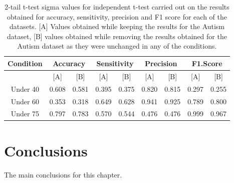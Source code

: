 \begin{table}[!htbp]
\centering
\begin{tabular}{*9c}
  \hline
  \rowcolor{LightCyan}
Condition &\multicolumn{2}{c}{Accuracy} &\multicolumn{2}{c}{Sensitivity} &\multicolumn{2}{c}{Precision}&\multicolumn{2}{c}{F1.Score}\\
  \hline
           & [A] & [B] & [A] & [B] & [A] & [B] & [A] & [B] \\
Under 40  &0.608& 0.581& 0.395 & 0.375 & 0.820 & 0.815 & 0.297 & 0.255 \\ 
  Under 60 &0.353& 0.318& 0.649 & 0.628 & 0.941 & 0.925 & 0.789 & 0.800 \\ 
  Under 75 &0.797&0.783 & 0.570 & 0.544 & 0.476 & 0.476 & 0.999 & 0.967 \\ 
   \hline
\end{tabular}
\caption{2-tail t-test sigma values for independent t-test carried out on the results obtained for accuracy, sensitivity, precision and F1 score for each of the datasets. [A] Values obtained while keeping the results for the Autism dataset, [B] values obtained while removing the results obtained for the Autism dataset as they were unchanged in any of the conditions.}
\end{table}
 

\section{Conclusions}

The main conclusions for this chapter.


